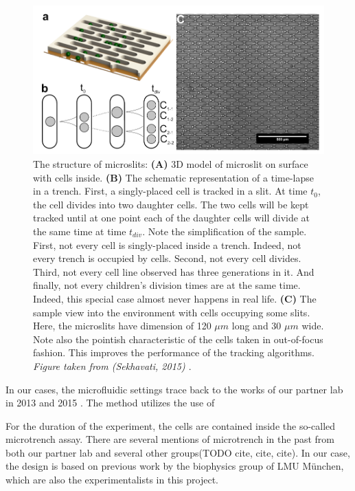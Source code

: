 \documentclass[pdftex,12pt,a4paper]{report}
\begin{document}
\begin{figure}[h]
\centering
\includegraphics[width=1\textwidth]{images/trenches-sekhavati}
\caption{The structure of microslits: \textbf{(A)} 3D model of microslit on surface with cells inside. \textbf{(B)} The schematic representation of a time-lapse in a trench. First, a singly-placed cell is tracked in a slit. At time $t_0$, the cell divides into two daughter cells. The two cells will be kept tracked until at one point each of the daughter cells will divide at the same time at time $t_{div}$. Note the simplification of the sample. First, not every cell is singly-placed inside a trench. Indeed, not every trench is occupied by cells. Second, not every cell divides. Third, not every cell line observed has three generations in it. And finally, not every children's division times are at the same time. Indeed, this special case almost never happens in real life. \textbf{(C)} The sample view into the environment with cells occupying some slits. Here, the microslits have dimension of 120 $\mu m$ long and 30 $\mu m$ wide. Note also the pointish characteristic of the cells taken in out-of-focus fashion. This improves the performance of the tracking algorithms. \textit{Figure taken from (Sekhavati, 2015) \cite{sekhavati2015dynamic}}.}
\label{fig:ibidi}
\end{figure}

In our cases, the microfluidic settings trace back to the works of our partner lab in 2013 \cite{marel2013arraying} and 2015 \cite{sekhavati2015marker, sekhavati2015dynamic}. The method utilizes the use of 



For the duration of the experiment, the cells are contained inside the so-called microtrench assay. There are several mentions of microtrench in the past from both our partner lab and several other groups(TODO cite, cite, cite). In our case, the design is based on previous work by the biophysics group of LMU M\"unchen, which are also the experimentalists in this project.
\end{document}
